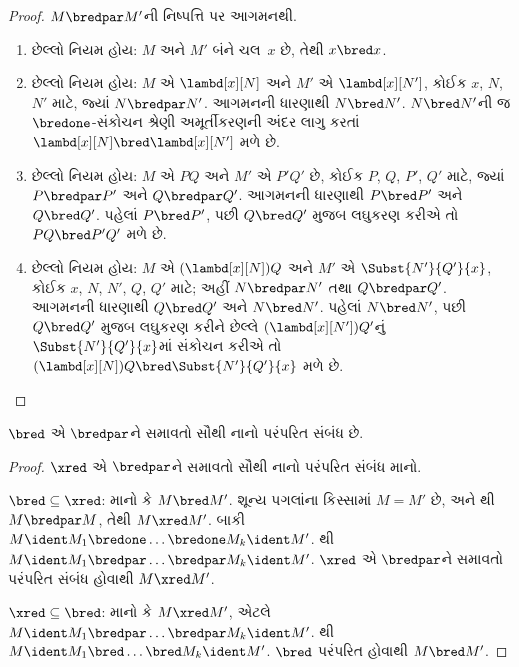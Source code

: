\begin{proof}
  $M \bredpar M'$ની નિષ્પત્તિ પર આગમનથી.
  \begin{enumerate}
  \item છેલ્લો નિયમ  હોય:
    $M$ અને $M'$ બંને ચલ~$x$ છે, તેથી $x \bred x$.
  \item છેલ્લો નિયમ  હોય:
    $M$ એ $\lambd[x][N]$ અને $M'$ એ
    $\lambd[x][N']$, કોઈક $x$, $N$, $N'$ માટે,
    જ્યાં $N \bredpar N'$. આગમનની ધારણાથી
    $N \bred N'$. $N \bred N'$ની જ $\bredone$-સંકોચન શ્રેણી
    અમૂર્તીકરણની અંદર
    લાગુ કરતાં $\lambd[x][N] \bred
    \lambd[x][N']$ મળે છે.
  \item છેલ્લો નિયમ  હોય:
    $M$ એ $PQ$ અને $M'$ એ $P'Q'$ છે,
    કોઈક $P$, $Q$, $P'$, $Q'$ માટે, જ્યાં
    $P \bredpar P'$ અને $Q \bredpar Q'$.
    આગમનની ધારણાથી $P \bred P'$ અને
    $Q \bred Q'$. પહેલાં $P \bred P'$,
    પછી $Q \bred Q'$ મુજબ લઘુકરણ કરીએ તો
    $PQ \bred P'Q'$ મળે છે.
  \item છેલ્લો નિયમ  હોય:
    $M$ એ $(\lambd[x][N])Q$ અને
    $M'$ એ $\Subst{N'}{Q'}{x}$, કોઈક
    $x$, $N$, $N'$, $Q$, $Q'$ માટે; અહીં
    $N \bredpar N'$ તથા $Q \bredpar Q'$.
    આગમનની ધારણાથી $Q \bred Q'$ અને
    $N \bred N'$. પહેલાં $N \bred N'$, પછી
    $Q \bred Q'$ મુજબ લઘુકરણ કરીને છેલ્લે
    $(\lambd[x][N'])Q'$નું
    $\Subst{N'}{Q'}{x}$માં સંકોચન કરીએ તો
    $(\lambd[x][N])Q \bred
    \Subst{N'}{Q'}{x}$ મળે છે.
  \end{enumerate}
\end{proof}

\begin{lem}
  $\bred$ એ $\bredpar$ને સમાવતો સૌથી નાનો
  પરંપરિત સંબંધ છે.
\end{lem}

\begin{proof}
  $\xred$ એ $\bredpar$ને સમાવતો સૌથી નાનો
  પરંપરિત સંબંધ માનો.

  $\bred \subseteq \xred$: માનો કે $M \bred M'$.
  શૂન્ય પગલાંના કિસ્સામાં $M=M'$ છે, અને
  થી $M \bredpar M$, તેથી
  $M \xred M'$. બાકી $M \ident M_1
  \bredone \dots \bredone M_k \ident M'$.
  થી $M \ident M_1
  \bredpar \dots \bredpar M_k \ident M'$.
  $\xred$ એ $\bredpar$ને સમાવતો પરંપરિત
  સંબંધ હોવાથી $M \xred M'$.

  $\xred \subseteq \bred$: માનો કે $M \xred M'$,
  એટલે $M \ident M_1 \bredpar \dots
  \bredpar M_k \ident M'$. થી
  $M \ident M_1 \bred \dots \bred
  M_k \ident M'$. $\bred$ પરંપરિત હોવાથી
  $M \bred M'$.
\end{proof}

